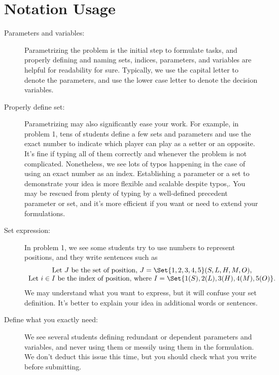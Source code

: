 \documentclass{OR_SolutionTheme}
\begin{document}
\section{Notation Usage}\label{sec:notation}
\begin{description}
    \item[Parameters and variables:]
    Parametrizing the problem is the initial step to formulate tasks,
    and properly defining and naming sets, indices, parameters, and variables
    are helpful for readability for sure.
    Typically, we use the capital letter to denote the parameters, and
    use the lower case letter to denote the decision variables.
    
    \item[Properly define set:]
    Parametrizing may also significantly ease your work. For example,
    in problem 1, tens of students define a few sets and parameters and use the exact
    number to indicate which player can play as a setter or an opposite. 
    It's fine if typing all of them correctly and whenever the problem is not complicated.
    Nonetheless, we see lots of typos happening in the case of using an exact number as an index.
    Establishing a parameter or a set to demonstrate your idea
    is more flexible and scalable despite typos,. You may be rescued from plenty of typing by 
    a well-defined precedent parameter or set, and it's more efficient if you want or 
    need to extend your formulations.
    
    \item[Set expression:]
    In problem 1, we see some students try to
    use numbers to represent positions, and they
    write sentences such as
    \[
        \begin{array}{c}
            \text{Let } J \text{ be the set of position, }
            J=\Set{1,2,3,4,5}(S,L,H,M,O),    \\
            \text{Let } i\in I \text{ be the 
            index of position, where } 
            I=\Set{1(S),2(L),3(H),4(M),5(O)}.
        \end{array}
    \]
    We may understand what you want to express,
    but it will confuse your set definition.
    It's better to explain your idea
    in additional words or sentences.
    
    \item[Define what you exactly need:]
    We see several students defining redundant
    or dependent parameters and variables, and
    never using them or messily using them in the formulation.
    We don't deduct this issue this time, but
    you should check what you write before submitting.

\end{description}
\end{document}
